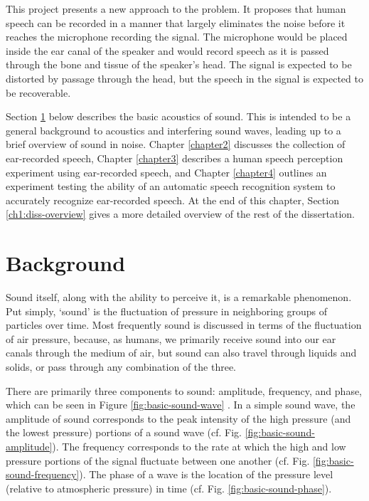 This project presents a new approach to the problem.  It proposes that human speech can be recorded in a manner that largely eliminates the noise before it reaches the microphone recording the signal.  The microphone would be placed inside the ear canal of the speaker and would record speech as it is passed through the bone and tissue of the speaker's head.  The signal is expected to be distorted by passage through the head, but the speech in the signal is expected to be recoverable.  \DIFaddbegin {}\DIFaddend 

Section \ref{ch1:background} below describes the basic acoustics of sound.  This is intended to be a general background to acoustics and interfering sound waves, leading up to a brief overview of sound in noise. Chapter \ref{chapter2} discusses the collection of ear-recorded speech, Chapter \ref{chapter3} describes a human speech perception experiment using ear-recorded speech, and Chapter \ref{chapter4} outlines an experiment testing the ability of an automatic speech recognition system to accurately recognize ear-recorded speech.  At the end of this chapter, Section \ref{ch1:diss-overview} gives a more detailed overview of the rest of the dissertation.

\section{Background}\label{ch1:background}

Sound itself, along with the ability to perceive it, is a remarkable phenomenon.  Put simply, `sound' is the fluctuation of pressure in neighboring groups of particles over time. Most frequently sound is discussed in terms of the fluctuation of air pressure, because, as humans, we primarily receive sound into our ear canals through the medium of air, but sound can also travel through \DIFdelbegin {}\DIFdelend liquids and solids, or pass through any combination of the three.

There are primarily three components to sound: amplitude, frequency, and phase, which can be seen in Figure \ref{fig:basic-sound-wave} \DIFaddbegin {}\DIFaddend .  In a simple sound wave, the amplitude of sound corresponds to the peak intensity of the high pressure (and the lowest pressure) portions of a sound wave (cf. Fig. \ref{fig:basic-sound-amplitude}).  The frequency corresponds to the rate at which the high and low pressure portions of the signal fluctuate between one another (cf. Fig. \ref{fig:basic-sound-frequency}).  The phase of a wave is the location of the pressure level (relative to atmospheric pressure) \DIFaddbegin {}\DIFaddend in time (cf. Fig. \ref{fig:basic-sound-phase}).   

